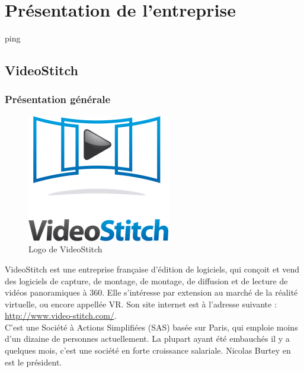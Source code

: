 \chapter{Présentation de l'entreprise}
ping
\section{VideoStitch}
\subsection{Présentation générale}
\begin{figure}
    \includegraphics{images/videostitch.png}
    \caption{Logo de VideoStitch}
\end{figure}
VideoStitch est une entreprise française d'édition de logiciels, qui conçoit et vend des logiciels de capture, de montage, de montage, de diffusion et de lecture de vidéos panoramiques à 360\degree. Elle s'intéresse par extension au marché de la réalité virtuelle, ou encore appellée VR.
Son site internet est à l'adresse suivante : \url{http://www.video-stitch.com/}.\\
C'est une Société à Actions Simplifiées (SAS) basée sur Paris, qui emploie moins d'un dizaine de personnes actuellement. 
La plupart ayant été embauchés il y a quelques mois, c'est une société en forte croissance salariale. 
Nicolas Burtey en est le président.


